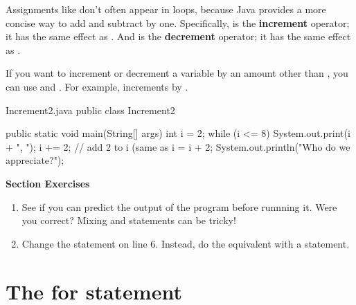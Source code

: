 Assignments like  don't often appear in loops, because Java provides a more concise way to add and subtract by one.
Specifically, \java{++} is the {\bf increment} operator; it has the same effect as .
And \java{--} is the {\bf decrement} operator; it has the same effect as .


If you want to increment or decrement a variable by an amount other than , you can use \java{+=} and \java{-=}.
For example,  increments  by .

%
%
\begin{trinket} [230] {Increment2.java}
public class Increment2 {

    public static void main(String[] args) {
       int i = 2;
       while (i <= 8) {
          System.out.print(i + ", ");
          i += 2;  // add 2 to i (same as i = i + 2;
       }
       System.out.println("Who do we appreciate?");
    }
}
\end{trinket}

\textbf{Section Exercises}
\begin{enumerate}
\item See if you can predict the output of the program before runnning it.  Were you correct?  Mixing  and  statements can be tricky!
\item Change the  statement on line 6.  Instead, do the equivalent with a  statement.
\end{enumerate}

\section{The for statement}


